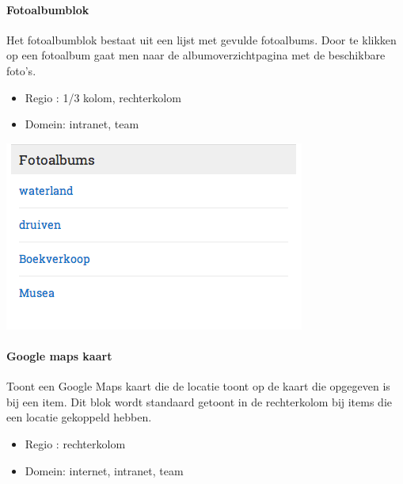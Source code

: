 \paragraph{Fotoalbumblok}\label{fotoalbumblok}

Het fotoalbumblok bestaat uit een lijst met gevulde fotoalbums. Door te klikken op een fotoalbum gaat men naar de albumoverzichtpagina met de beschikbare foto's.

\begin{itemize}
\item Regio : 1/3 kolom, rechterkolom
\item Domein: intranet, team
\end{itemize}

\begin{center}
	\includegraphics[scale=0.5]{img/blokken/fotoalbum.png}
\end{center}

\paragraph{Google maps kaart}

Toont een Google Maps kaart die de locatie toont op de kaart die opgegeven is bij een item. Dit blok wordt standaard getoont in de rechterkolom bij items die een locatie gekoppeld hebben.

\begin{itemize}
\item Regio : rechterkolom
\item Domein: internet, intranet, team
\end{itemize}

